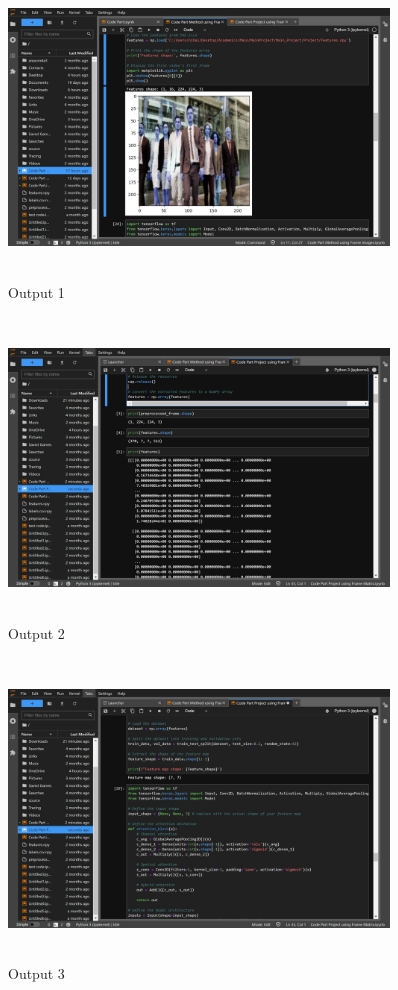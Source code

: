\documentclass[12pt]{report}
\begin{document}
\begin{figure}[htbp]
  \centering
  \includegraphics [width=0.9\textwidth, height=8cm]{6.jpeg}
  \caption{Output 1}
  \label{fig:image}
\end{figure}

\begin{figure}[htbp]
  \centering
  \includegraphics [width=0.9\textwidth, height=8cm]{7.jpeg}
  \caption{Output 2}
  \label{fig:image}
\end{figure}

\begin{figure}[htbp]
  \centering
  \includegraphics [width=0.9\textwidth, height=8cm]{8.jpeg}
  \caption{Output 3}
  \label{fig:image}
\end{figure}
\end{document}
